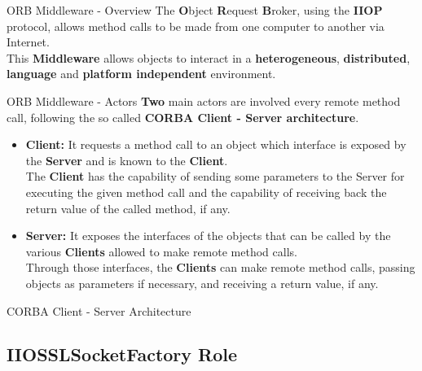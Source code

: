 \documentclass{../common/latex_classes/pdf_presentation}
\begin{document}
		\begin{frame}{ORB Middleware - Overview}
			The \textbf{O}bject \textbf{R}equest \textbf{B}roker, using the \textbf{IIOP} protocol, allows method calls to be made from one computer to another via Internet. \\
			This \textbf{Middleware} allows objects to interact in a \textbf{heterogeneous}, \textbf{distributed}, \textbf{language} and \textbf{platform independent} environment.	
		\end{frame}
			
		\begin{frame}{ORB Middleware - Actors}
			\textbf{Two} main actors are involved every remote method call, following the so called \textbf{CORBA Client - Server architecture}.
			\begin{itemize}
				\item \textbf{Client:}
					It requests a method call to an object which interface is exposed by the \textbf{Server} and is known to the \textbf{Client}.\\
					The \textbf{Client} has the capability of sending some parameters to the Server for executing the given method call and the capability of receiving back the return value of the called method, if any.
				\item \textbf{Server:}
					It exposes the interfaces of the objects that can be called by the various \textbf{Clients} allowed to make remote method calls.\\
					Through those interfaces, the \textbf{Clients} can make remote method calls, passing objects as parameters if necessary, and receiving a return value, if any.
			\end{itemize}
		\end{frame}
		
		\begin{frame}{CORBA Client - Server Architecture}
		\end{frame}
		
		\subsection{IIOSSLSocketFactory Role}
		
\end{document}
